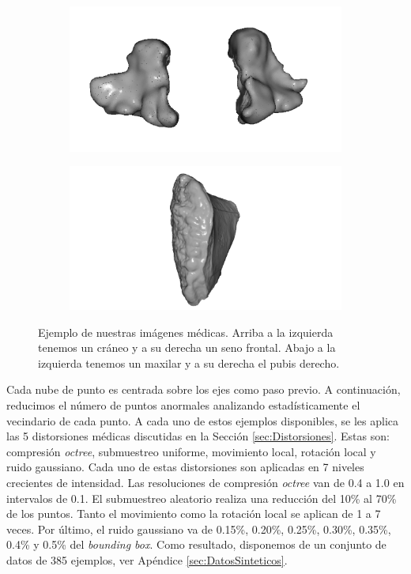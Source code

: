 \begin{figure}[htp]
  \begin{subfigure}[b]{0.40\textwidth}
  \centering 
  \includegraphics[width=\textwidth]{imagenes/chapter4/Maxilar100205.png}
  \end{subfigure}
  \begin{subfigure}[b]{0.40\textwidth}
  \centering 
  \includegraphics[width=\textwidth]{imagenes/chapter4/PubisDch.png}
  \end{subfigure}
  \caption[Ejemplo de nuestras imágenes médicas.]{Ejemplo de nuestras imágenes médicas.
  Arriba a la izquierda tenemos un cráneo y a su derecha un seno frontal. 
  Abajo a la izquierda tenemos un maxilar y a su derecha el pubis derecho.}
  \label{fig:OurDataExample}
\end{figure}

Cada nube de punto es centrada sobre los ejes como paso previo. A continuación, 
reducimos el número de puntos anormales analizando estadísticamente el vecindario de cada punto. 
A cada uno de estos ejemplos disponibles, se les aplica las 5 distorsiones médicas
discutidas en la Sección \ref{sec:Distorsiones}. 
Estas son: compresión \emph{octree}, submuestreo uniforme, movimiento local, rotación local 
y ruido gaussiano. Cada uno de estas distorsiones son 
aplicadas en 7 niveles crecientes de intensidad.
Las resoluciones de compresión \emph{octree} van de 0.4 a 1.0 en intervalos de 0.1.
El submuestreo aleatorio realiza una reducción del 10\% al 70\% de los puntos.
Tanto el movimiento como la rotación local se aplican de 1 a 7 veces.
Por último, el ruido gaussiano va de 0.15\%, 0.20\%, 0.25\%, 0.30\%, 0.35\%, 0.4\% y 0.5\% del \emph{bounding box}.
 Como resultado, disponemos de un conjunto de datos de 385 ejemplos, 
ver Apéndice \ref{sec:DatosSinteticos}. 


